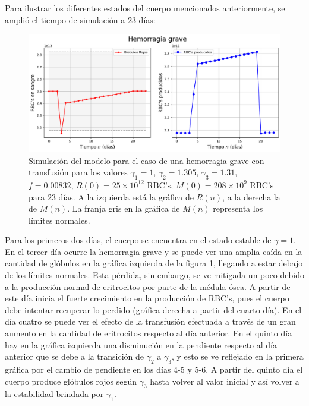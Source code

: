 Para ilustrar los diferentes estados del cuerpo mencionados anteriormente, se amplió el tiempo de simulación a 23 días: 

\begin{figure}[H]
    \centering
    \captionsetup{justification=centering}
    \includegraphics[scale=0.534]{figures/HemoGrave.png}
    \caption{Simulación del modelo para el caso de una hemorragia grave con transfusión para los valores $\gamma_1 = 1$, $\gamma_2=1.305$, $\gamma_3=1.31$, $f = 0.00832$, $R(0)=25\times 10^{12}$ RBC's, $M(0) = 208\times 10^{9}$ RBC's para 23 días. A la izquierda está la gráfica de $R(n)$, a la derecha la de $M(n)$. La franja gris en la gráfica de $M(n)$ representa los límites normales.}
    \label{sec:variaciones:fig:HemoGrave}
\end{figure}

Para los primeros dos días, el cuerpo se encuentra en el estado estable de $\gamma = 1$. En el tercer día ocurre la hemorragia grave y se puede ver una amplia caída en la cantidad de glóbulos en la gráfica izquierda de la figura \ref{sec:variaciones:fig:HemoGrave}, llegando a estar debajo de los límites normales. Esta pérdida, sin embargo, se ve mitigada un poco debido a la producción normal de eritrocitos por parte de la médula ósea. A partir de este día inicia el fuerte crecimiento en la producción de RBC's, pues el cuerpo debe intentar recuperar lo perdido (gráfica derecha a partir del cuarto día). En el día cuatro se puede ver el efecto de la transfusión efectuada a través de un gran aumento en la cantidad de eritrocitos respecto al día anterior. En el quinto día hay en la gráfica izquierda una disminución en la pendiente respecto al día anterior que se debe a la transición de $\gamma_2$ a $\gamma_3$, y esto se ve reflejado en la primera gráfica por el cambio de pendiente en los días 4-5 y 5-6. A partir del quinto día el cuerpo produce glóbulos rojos según $\gamma_3$ hasta volver al valor inicial y así volver a la estabilidad brindada por $\gamma_1$.

